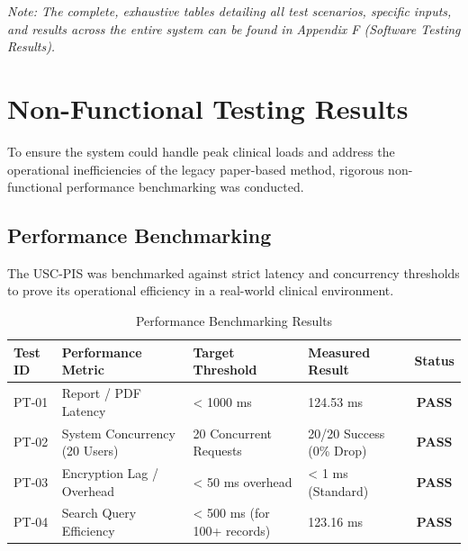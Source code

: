 \textit{Note: The complete, exhaustive tables detailing all test scenarios, specific inputs, and results across the entire system can be found in Appendix F (Software Testing Results).}

\section{Non-Functional Testing Results}

To ensure the system could handle peak clinical loads and address the operational inefficiencies of the legacy paper-based method, rigorous non-functional performance benchmarking was conducted.

\subsection{Performance Benchmarking}

The USC-PIS was benchmarked against strict latency and concurrency thresholds to prove its operational efficiency in a real-world clinical environment.

\begin{table}[htbp]
    \centering
    \caption{Performance Benchmarking Results}
    \label{tab:performance_benchmarking}
    \begin{tabularx}{\textwidth}{|l|Y|Y|Y|c|}
        \hline
        \textbf{Test ID} & \textbf{Performance Metric} & \textbf{Target Threshold} & \textbf{Measured Result} & \textbf{Status} \\ \hline
        PT-01 & Report / PDF Latency & < 1000 ms & 124.53 ms & \textbf{PASS} \\ \hline
        PT-02 & System Concurrency (20 Users) & 20 Concurrent Requests & 20/20 Success (0\% Drop) & \textbf{PASS} \\ \hline
        PT-03 & Encryption Lag / Overhead & < 50 ms overhead & < 1 ms (Standard) & \textbf{PASS} \\ \hline
        PT-04 & Search Query Efficiency & < 500 ms (for 100+ records) & 123.16 ms & \textbf{PASS} \\ \hline
    \end{tabularx}
\end{table}

